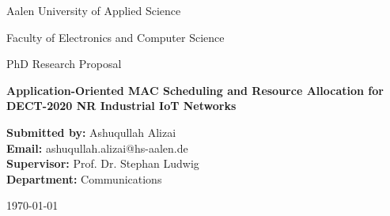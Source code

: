 \documentclass[12pt,a4paper]{article}
\begin{document}
\begin{titlepage}
    \centering
    
    {\Large Aalen University of Applied Science \par}
    \vspace{0.5cm}
    {\large Faculty of Electronics and Computer Science \par}
      \vspace{1cm}
    {\Large PhD Research Proposal \par}
    \vspace{6cm}
    
    {\Huge \textbf{Application-Oriented MAC Scheduling and Resource Allocation for DECT-2020 NR Industrial IoT Networks} \par}
    
    \vspace{1.5cm}
    
    
    
    \vspace{6cm}
    
    \begin{flushleft}
    \textbf{Submitted by:} Ashuqullah Alizai \\
    \textbf{Email:} ashuqullah.alizai@hs-aalen.de\\
    \textbf{Supervisor:} Prof. Dr. Stephan Ludwig \\
    \textbf{Department:} Communications  \\
    \end{flushleft}
    
    \vfill
    
    {\large \today \par}
    
\end{titlepage}
\end{document}
